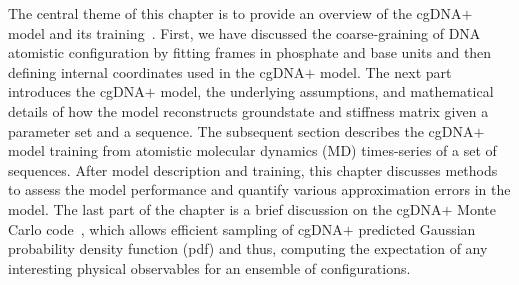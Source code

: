The central theme of this chapter is to provide an overview of the cgDNA$+$ model and its training~\cite{patelithesis}.
First, we have discussed the coarse-graining of DNA atomistic configuration by fitting frames in phosphate and base units and then defining internal coordinates used in the cgDNA$+$ model.
The next part introduces the cgDNA$+$ model, the underlying assumptions, and mathematical details of how the model reconstructs groundstate and stiffness matrix given a parameter set and a sequence. 
The subsequent section describes the cgDNA$+$ model training from atomistic molecular dynamics (MD) times-series of a set of sequences.
After model description and training, this chapter discusses methods to assess the model performance and quantify various approximation errors in the model.
The last part of the chapter is a brief discussion on the cgDNA$+$ Monte Carlo code~\cite{cgdnamc}, which allows efficient sampling of cgDNA$+$ predicted Gaussian probability density function (pdf) and thus, computing the expectation of any interesting physical observables for an ensemble of configurations.
